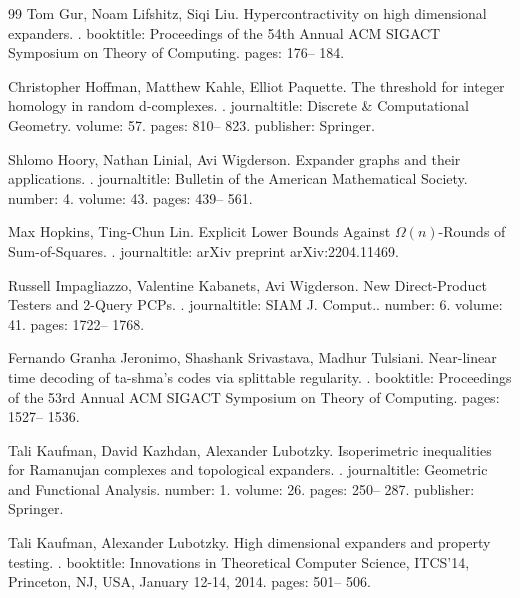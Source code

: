\begin{thebibliography}{99}
Tom Gur, Noam Lifshitz, Siqi Liu.
\newblock Hypercontractivity on high dimensional expanders.
.
\newblock booktitle: Proceedings of the 54th Annual ACM SIGACT Symposium on Theory of Computing.
\newblock pages: 176-- 184.

Christopher Hoffman, Matthew Kahle, Elliot Paquette.
\newblock The threshold for integer homology in random d-complexes.
.
\newblock journaltitle: Discrete \& Computational Geometry.
\newblock volume: 57.
\newblock pages: 810-- 823.
\newblock publisher: Springer.

Shlomo Hoory, Nathan Linial, Avi Wigderson.
\newblock Expander graphs and their applications.
.
\newblock journaltitle: Bulletin of the American Mathematical Society.
\newblock number: 4.
\newblock volume: 43.
\newblock pages: 439-- 561.

Max Hopkins, Ting-Chun Lin.
\newblock Explicit Lower Bounds Against $\Omega(n)$-Rounds of Sum-of-Squares.
.
\newblock journaltitle: arXiv preprint arXiv:2204.11469.

Russell Impagliazzo, Valentine Kabanets, Avi Wigderson.
\newblock New Direct-Product Testers and 2-Query {PCP}s.
.
\newblock journaltitle: SIAM J. Comput..
\newblock number: 6.
\newblock volume: 41.
\newblock pages: 1722-- 1768.

Fernando Granha Jeronimo, Shashank Srivastava, Madhur Tulsiani.
\newblock Near-linear time decoding of ta-shma’s codes via splittable regularity.
.
\newblock booktitle: Proceedings of the 53rd Annual ACM SIGACT Symposium on Theory of Computing.
\newblock pages: 1527-- 1536.

Tali Kaufman, David Kazhdan, Alexander Lubotzky.
\newblock Isoperimetric inequalities for Ramanujan complexes and topological expanders.
.
\newblock journaltitle: Geometric and Functional Analysis.
\newblock number: 1.
\newblock volume: 26.
\newblock pages: 250-- 287.
\newblock publisher: Springer.

Tali Kaufman, Alexander Lubotzky.
\newblock High dimensional expanders and property testing.
.
\newblock booktitle: Innovations in Theoretical Computer Science, ITCS'14, Princeton, NJ, USA, January 12-14, 2014.
\newblock pages: 501-- 506.


\end{thebibliography}
